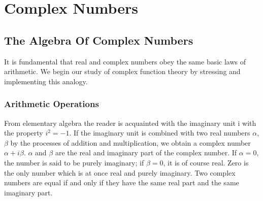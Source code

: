 \chapter{Complex Numbers}\label{chap:1}

\setcounter{section}{0}\section{The Algebra Of Complex Numbers}\label{sec:1.1}
It is fundamental that real and complex numbers obey the same basic laws of arithmetic. We begin our study of complex function theory by stressing and implementing this analogy.

\setcounter{section}{1}\setcounter{subsection}{0}\subsection{Arithmetic Operations}\label{sec:1.1.1}
From elementary algebra the reader is acquainted with the imaginary unit i with the property $i^{2} = -1$. If the imaginary unit is combined with two real numbers $\alpha$, $\beta$ by the processes of addition and multiplication, we obtain a complex number $\alpha + i\beta$. $\alpha$ and $\beta$ are the real and imaginary part of the complex number. If $\alpha = 0$, the number is said to be purely imaginary; if $\beta = 0$, it is of course real. Zero is the only number which is at once real and purely imaginary. Two complex numbers are equal if and only if they have the same real part and the same imaginary part.


